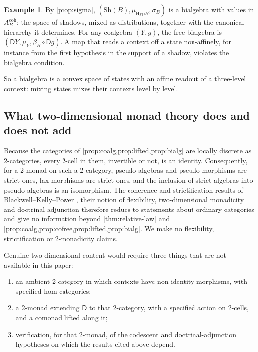 \documentclass[11pt]{article}
\theoremstyle{definition}
\newtheorem{example}[theorem]{Example}
\theoremstyle{remark}
\newcommand{\D}{\mathsf{D}}
\newcommand{\Hyp}{\mathrm{Hyp}}
\newcommand{\Sh}{\mathrm{Sh}}
\begin{document}
\begin{example}
By \cref{prop:sigma}, $(\Sh(B),\mu_{\Hyp B},\sigma_B)$ is a bialgebra with values in
$A^{\mathrm{coh}}_B$: the space of shadows, mixed as distributions, together with the canonical
hierarchy it determines. For any coalgebra $(Y,g)$, the free bialgebra is
$(\D Y,\mu_Y,\beta_B\circ\D g)$. A map that reads a context off a state non-affinely, for instance from
the first hypothesis in the support of a shadow, violates the bialgebra condition.
\end{example}

So a bialgebra is a convex space of states with an affine readout of a three-level context: mixing
states mixes their contexts level by level.

\subsection{What two-dimensional monad theory does and does not add}\label{sec:2d}

Because the categories of \cref{prop:coalg,prop:lifted,prop:bialg} are locally discrete as
2-categories, every 2-cell in them, invertible or not, is an identity. Consequently, for
a 2-monad on such a 2-category, pseudo-algebras and pseudo-morphisms are strict ones, lax morphisms
are strict ones, and the inclusion of strict algebras into pseudo-algebras is an isomorphism. The
coherence and strictification results of Blackwell--Kelly--Power \cite{BKP1989,Lack2002}, their
notion of flexibility, two-dimensional monadicity \cite{Bourke2014} and doctrinal adjunction
\cite{Kelly1974} therefore reduce to statements about ordinary categories and give no information
beyond \cref{thm:relative-law} and \cref{prop:coalg,prop:cofree,prop:lifted,prop:bialg}. We make no
flexibility, strictification or 2-monadicity claims.

Genuine two-dimensional content would require three things that are not available in this paper:
\begin{enumerate}[label=(\roman*)]
\item an ambient 2-category in which contexts have non-identity morphisms, with specified
  hom-categories;
\item a 2-monad extending $\D$ to that 2-category, with a specified action on 2-cells, and a
  comonad lifted along it;
\item verification, for that 2-monad, of the codescent and doctrinal-adjunction hypotheses on which
  the results cited above depend.
\end{enumerate}
\end{document}
